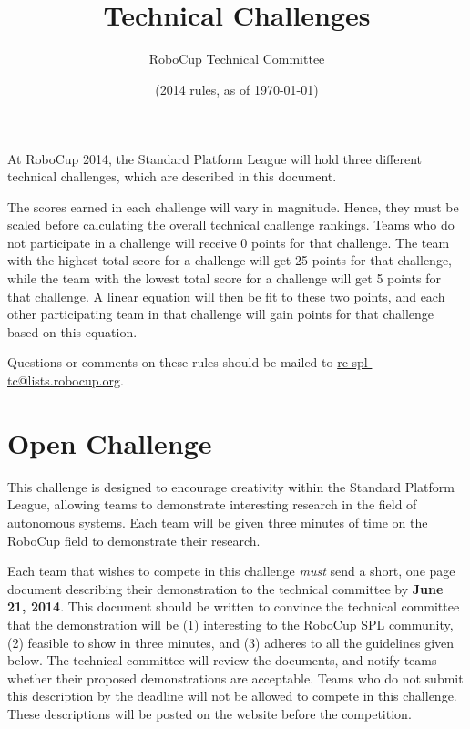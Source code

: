 \documentclass[12pt]{article}
\title{\leaguename \\ Technical Challenges}
\author{RoboCup Technical Committee}
\date{(2014 rules, as of \today)}
\begin{document}
\maketitle

At RoboCup 2014, the Standard Platform League will hold three different technical challenges, which are described in this document.

The scores earned in each challenge will vary in magnitude.  Hence, they must be scaled before calculating the overall technical challenge rankings.  Teams who do not participate in a challenge will receive 0 points for that challenge.  The team with the highest total score for a challenge will get 25 points for that challenge, while the team with the lowest total score for a challenge will get 5 points for that challenge.  A linear equation will then be fit to these two points, and each other participating team in that challenge will gain points for that challenge based on this equation.

Questions or comments on these rules should be mailed to {\small \url{rc-spl-tc@lists.robocup.org}}.

\vfill

\renewcommand\contentsname{Challenges}
\tableofcontents
\setcounter{tocdepth}{1}

\thispagestyle{fancy}

\clearpage

\cfoot{\thepage}
\setcounter{page}{1}






\section{Open Challenge}
\newcommand{\openMinNum}{three}

This challenge is designed to encourage creativity within the Standard 
Platform League, allowing teams to demonstrate interesting research in 
the field of autonomous systems. Each team will be given \openMinNum{} 
minutes of time on the RoboCup field to demonstrate their research.

Each team that wishes to compete in this challenge \emph{must} send a 
short, one page document describing their demonstration to the technical 
committee by \textbf{June 21, 2014}.  This document should be written to 
convince the technical committee that the demonstration will be (1) interesting 
to the RoboCup SPL community, (2) feasible to show in \openMinNum{} minutes, and 
(3) adheres to all the guidelines given below. The technical committee will review 
the documents, and notify teams whether their proposed demonstrations are 
acceptable.  Teams who do not submit this description by 
the deadline will not be allowed to compete in this challenge. These 
descriptions will be posted on the website before the competition.
\end{document}
